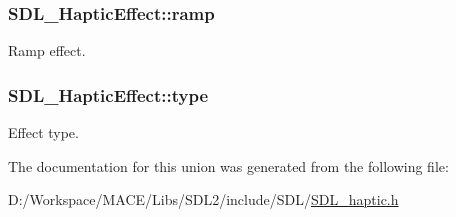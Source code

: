 \subsubsection[{\texorpdfstring{ramp}{ramp}}]{ S\+D\+L\+\_\+\+Haptic\+Effect\+::ramp}\hypertarget{union_s_d_l___haptic_effect_a1d32ef4c2d1cc89dc938b392f6ad81bd}{}\label{union_s_d_l___haptic_effect_a1d32ef4c2d1cc89dc938b392f6ad81bd}
Ramp effect. 
\subsubsection[{\texorpdfstring{type}{type}}]{ S\+D\+L\+\_\+\+Haptic\+Effect\+::type}\hypertarget{union_s_d_l___haptic_effect_a5ff6cfd8da91537091e9a6c2108cb179}{}\label{union_s_d_l___haptic_effect_a5ff6cfd8da91537091e9a6c2108cb179}
Effect type. 

The documentation for this union was generated from the following file\+:\begin{DoxyCompactItemize}
\item 
D\+:/\+Workspace/\+M\+A\+C\+E/\+Libs/\+S\+D\+L2/include/\+S\+D\+L/\hyperlink{_s_d_l__haptic_8h}{S\+D\+L\+\_\+haptic.\+h}\end{DoxyCompactItemize}
